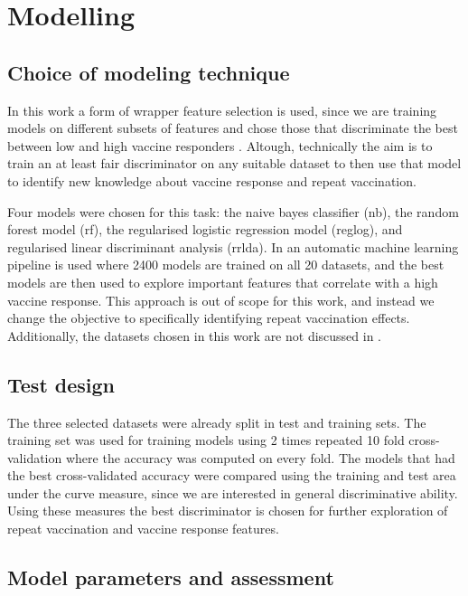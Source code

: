 \section{Modelling}

\subsection{Choice of modeling technique}

In this work a form of wrapper feature selection is used, since we are training
models on different subsets of features and chose those that discriminate the
best between low and high vaccine responders
\citep{hiraReviewFeatureSelection2015}. Altough, technically the aim is to
train an at least fair discriminator on any suitable dataset to then use that
model to identify new knowledge about vaccine response and repeat vaccination.

Four models were chosen for this task: the naive bayes classifier (nb), the
random forest model (rf), the regularised logistic regression model (reglog),
and regularised linear discriminant analysis (rrlda). In \spaper an automatic
machine learning pipeline is used where 2400 models are trained on all 20
datasets, and the best models are then used to explore important features that
correlate with a high vaccine response. This approach is out of scope for this
work, and instead we change the objective to specifically identifying repeat
vaccination effects. Additionally, the datasets chosen in this work are not
discussed in \spaper.

\subsection{Test design}

The three selected datasets were already split in test and training sets. The
training set was used for training models using 2 times repeated 10 fold
cross-validation where the accuracy was computed on every fold. The models that
had the best cross-validated accuracy were compared using the training and test
area under the curve measure, since we are interested in general discriminative
ability. Using these measures the best discriminator is chosen for further
exploration of repeat vaccination and vaccine response features.

\subsection{Model parameters and assessment}

